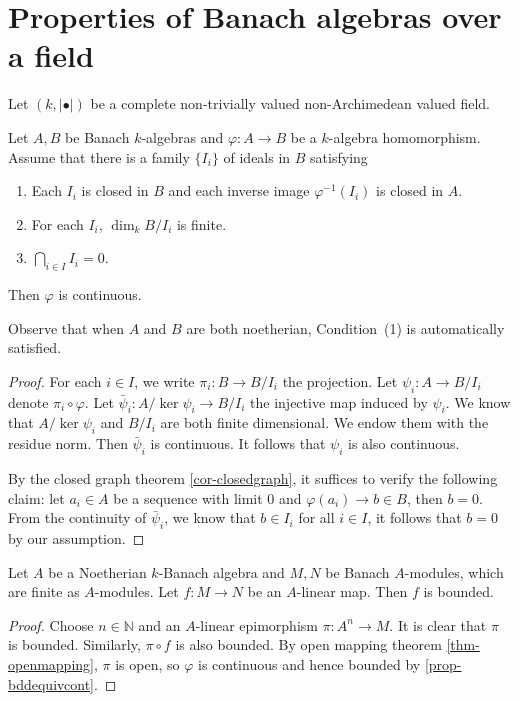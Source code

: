 \section{Properties of Banach algebras over a field}
Let $(k,|\bullet|)$ be a complete non-trivially valued non-Archimedean valued field.
\begin{proposition}\label{prop-morphismBanachcont}
    Let $A,B$ be Banach $k$-algebras and $\varphi:A\rightarrow B$ be a $k$-algebra homomorphism. Assume that there is a family $\{I_i\}$ of ideals in $B$ satisfying
    \begin{enumerate}
        \item Each $I_i$ is closed in $B$ and each inverse image $\varphi^{-1}(I_i)$ is closed in $A$.
        \item For each $I_i$, $\dim_k B/I_i$ is finite.
        \item $\bigcap_{i\in I} I_i=0$.
    \end{enumerate}
    Then $\varphi$ is continuous. 
\end{proposition}
Observe that when $A$ and $B$ are both noetherian, Condition~(1) is automatically satisfied.
\begin{proof}
    For each $i\in I$, we write $\pi_i:B\rightarrow B/I_i$ the projection.  Let $\psi_i:A\rightarrow B/I_i$ denote $\pi_i\circ \varphi$. Let $\bar{\psi}_i:A/\ker \psi_i\rightarrow B/I_{i}$ the injective map induced by $\psi_i$. We know that $A/\ker \psi_i$ and $B/I_i$ are both finite dimensional. We endow them with the residue norm. Then $\bar{\psi}_i$ is continuous. It follows that $\psi_i$ is also continuous. 

    By the closed graph theorem \cref{cor-closedgraph}, it suffices to verify the following claim: let $a_i\in A$ be a sequence with limit $0$ and $\varphi(a_i)\to b\in B$, then $b=0$. From the continuity of  $\bar{\psi}_i$, we know that $b\in I_i$ for all $i\in I$, it follows that $b=0$ by our assumption.
\end{proof}

\begin{lemma}\label{lma-finitemodulehomobdd}
    Let $A$ be a Noetherian $k$-Banach algebra and $M,N$ be Banach $A$-modules, which are finite as $A$-modules. Let $f:M\rightarrow N$ be an $A$-linear map. Then $f$ is bounded.
\end{lemma}
\begin{proof}
    Choose $n\in \mathbb{N}$ and an $A$-linear epimorphism $\pi:A^n\rightarrow M$. It is clear that $\pi$ is bounded. Similarly, $\pi\circ f$ is also bounded. By open mapping theorem \cref{thm-openmapping}, $\pi$ is open, so $\varphi$ is continuous and hence bounded by \cref{prop-bddequivcont}.
\end{proof}

